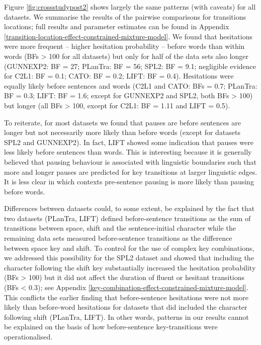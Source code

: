 \documentclass[
  man,floatsintext]{apa7}
\begin{document}
Figure \ref{fig:crossstudypost2} shows largely the same patterns (with caveats) for all datasets. We summarise the results of the pairwise comparisons for transitions locations; full results and parameter estimates can be found in Appendix \ref{transition-location-effect-constrained-mixture-model}. We found that hesitations were more frequent -- higher hesitation probability -- before words than within words (BFs \textgreater{} 100 for all datasets) but only for half of the data sets also longer (GUNNEXP2: BF = 27; PLanTra: BF = 56; SPL2: BF = 9.1; negligible evidence for C2L1: BF = 0.1; CATO: BF = 0.2; LIFT: BF = 0.4). Hesitations were equally likely before sentences and words (C2L1 and CATO: BFs = 0.7; PLanTra: BF = 0.3; LIFT: BF = 1.6; except for GUNNEXP2 and SPL2, both BFs \textgreater{} 100) but longer (all BFs \textgreater{} 100, except for C2L1: BF = 1.11 and LIFT = 0.5).

To reiterate, for most datasets we found that pauses are before sentences are longer but not necessarily more likely than before words (except for datasets SPL2 and GUNNEXP2). In fact, LIFT showed some indication that pauses were less likely before sentences than words. This is interesting because it is generally believed that pausing behaviour is associated with linguistic boundaries such that more and longer pauses are predicted for key transitions at larger linguistic edges. It is less clear in which contexts pre-sentence pausing is more likely than pausing before words.

Differences between datasets could, to some extent, be explained by the fact that two datasets (PLanTra, LIFT) defined before-sentence transitions as the sum of transitions between space, shift and the sentence-initial character while the remaining data sets measured before-sentence transitions as the difference between space key and shift. To control for the use of complex key combinations, we addressed this possibility for the SPL2 dataset and showed that including the character following the shift key substantially increased the hesitation probability (BFs \textgreater{} 100) but it did not affect the duration of fluent or hesitant transitions (BFs \textless{} 0.3); see Appendix \ref{key-combination-effect-constrained-mixture-model}. This conflicts the earlier finding that before-sentence hesitations were not more likely than before-word hesitations for datasets that did included the character following shift (PLanTra, LIFT). In other words, patterns in our results cannot be explained on the basis of how before-sentence key-transitions were operationalised.
\end{document}
